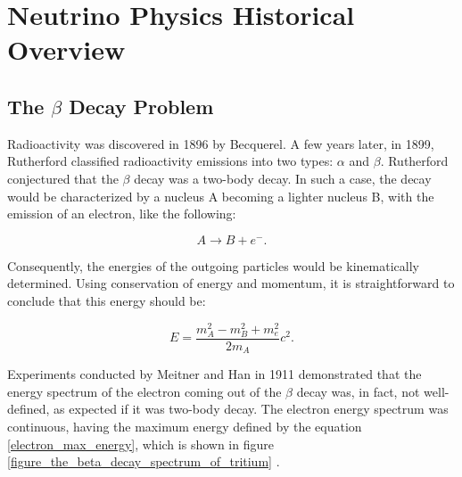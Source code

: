 \section{Neutrino Physics Historical Overview}

\subsection{The $\beta$ Decay Problem}

Radioactivity was discovered in 1896 by Becquerel. A few years later, in 1899, Rutherford classified radioactivity emissions into two types: $\alpha$ and $\beta$. Rutherford conjectured that the $\beta$ decay was a two-body decay. In such a case, the decay would be characterized by a nucleus A becoming a lighter nucleus B, with the emission of an electron, like the following:

\begin{equation}
	A \longrightarrow B + e^- .
\end{equation}

Consequently, the energies of the outgoing particles would be kinematically determined. 
Using conservation of energy and momentum, it is straightforward to conclude that this energy should be:

\begin{equation}
	E = \frac{m_A^2 - m_B^2 + m_e^2}{2m_A} c^2.
	\label{electron_max_energy} 
\end{equation}

Experiments conducted by Meitner and Han in 1911 demonstrated that the energy spectrum of the electron coming out of the $\beta$ decay was, in fact, not well-defined, as expected if it was two-body decay. The electron energy spectrum was continuous, having the maximum energy defined by the equation \ref{electron_max_energy}, which is shown in figure \ref{figure_the_beta_decay_spectrum_of_tritium} \cite{griffiths}.

